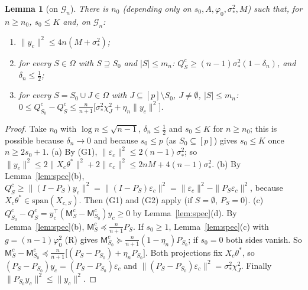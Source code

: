 \documentclass[11pt]{article}
\newtheorem{lemma}[theorem]{Lemma}
\theoremstyle{remark}
\newcommand{\tr}{^{\top}}
\newcommand{\Om}{\Omega}
\newcommand{\G}{\mathcal G}
\newcommand{\yc}{y_c}
\newcommand{\Xc}{X_c}
\newcommand{\eps}{\varepsilon}
\begin{document}
\begin{lemma}[on $\G_n$]\label{lem:onG}
There is $n_0$ (depending only on $s_0,A,\varphi_0,\sigma_*^2,M$) such that, for $n\ge n_0$, $s_0\le K$ and, on $\G_n$:
\begin{enumerate}
\item[(a)] $\|\yc\|^2\le4n(M+\sigma_*^2)$;
\item[(b)] for every $S\in\Om$ with $S\supseteq S_0$ and $|S|\le m_n$: $Q^c_S\ge(n-1)\sigma_*^2(1-\delta_n)$, and $\delta_n\le\frac12$;
\item[(c)] for every $S=S_0\cup J\in\Om$ with $J\subseteq[p]\setminus S_0$, $J\ne\emptyset$, $|S|\le m_n$: $0\le Q^c_{S_0}-Q^c_S\le\frac n{n+1}\big[\sigma_*^2\chi^2_J+\eta_n\|\yc\|^2\big]$.
\end{enumerate}
\end{lemma}
\begin{proof}
Take $n_0$ with $\log n\le\sqrt{n-1}$, $\delta_n\le\frac12$ and $s_0\le K$ for $n\ge n_0$; this is possible because $\delta_n\to0$ and because $s_0\le p$ (as $S_0\subseteq[p]$) gives $s_0\le K$ once $n\ge2s_0+1$.
(a) By (G1), $\|\eps_c\|^2\le2(n-1)\sigma_*^2$; so $\|\yc\|^2\le2\|\Xc\theta^*\|^2+2\|\eps_c\|^2\le2nM+4(n-1)\sigma_*^2$.
(b) By Lemma~\ref{lem:spec}(b), $Q^c_S\ge\|(I-P_S)\yc\|^2=\|(I-P_S)\eps_c\|^2=\|\eps_c\|^2-\|P_S\eps_c\|^2$, because $\Xc\theta^*\in\mathrm{span}(X_{c,S})$. Then (G1) and (G2) apply (if $S=\emptyset$, $P_S=0$).
(c) $Q^c_{S_0}-Q^c_S=\yc\tr(\mathsf{M}^c_S-\mathsf{M}^c_{S_0})\yc\ge0$ by Lemma~\ref{lem:spec}(d). By Lemma~\ref{lem:spec}(b), $\mathsf{M}^c_S\preceq\frac n{n+1}P_S$. If $s_0\ge1$, Lemma~\ref{lem:spec}(c) with $g=(n-1)\varphi_0^2$ (R) gives $\mathsf{M}^c_{S_0}\succeq\frac n{n+1}(1-\eta_n)P_{S_0}$; if $s_0=0$ both sides vanish. So
$\mathsf{M}^c_S-\mathsf{M}^c_{S_0}\preceq\frac n{n+1}\big[(P_S-P_{S_0})+\eta_nP_{S_0}\big]$. Both projections fix $\Xc\theta^*$, so $(P_S-P_{S_0})\yc=(P_S-P_{S_0})\eps_c$ and $\|(P_S-P_{S_0})\eps_c\|^2=\sigma_*^2\chi^2_J$. Finally $\|P_{S_0}\yc\|^2\le\|\yc\|^2$.
\end{proof}
\end{document}
